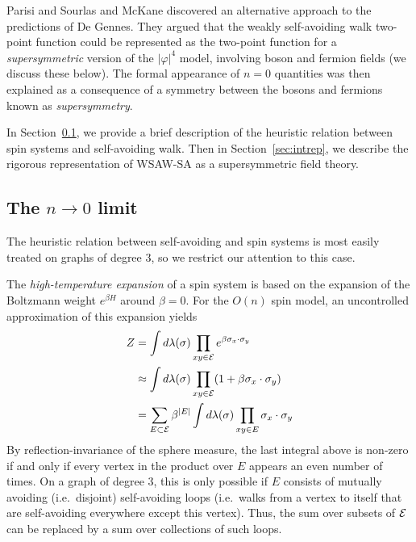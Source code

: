 Parisi and Sourlas \cite{PS80} and McKane \cite{McKa80} discovered
an alternative approach to the predictions of De Gennes. They argued that the weakly
self-avoiding walk two-point function could be represented as the two-point function
for a \emph{supersymmetric} version of the $|\varphi|^4$ model, involving boson and
fermion fields (we discuss these below). The formal appearance of $n = 0$ quantities
was then explained as a consequence of a symmetry between the bosons and fermions known
as \emph{supersymmetry}.

In Section~\ref{sec:ntozero}, we provide a brief description of the heuristic
relation between spin systems and self-avoiding walk. Then in Section~\ref{sec:intrep},
we describe the rigorous representation of WSAW-SA as a supersymmetric field
theory.


\subsection{The \texorpdfstring{$n\to0$}{n approaches 0} limit}
\label{sec:ntozero}

The heuristic relation between self-avoiding and spin systems is most easily treated
on graphs of degree $3$, so we restrict our attention to this case.

The \emph{high-temperature expansion} of a spin system is based on the expansion of the
Boltzmann weight $e^{\beta H}$ around $\beta = 0$.
For the $O(n)$ spin model, an uncontrolled approximation of this expansion yields
\begin{align}
Z 
	&=
\int d\lambda(\sigma) \prod_{xy\in\mathcal{E}} e^{\beta \sigma_x \cdot \sigma_y} \nonumber \\
	&\approx
\int d\lambda(\sigma) \prod_{xy\in\mathcal{E}} (1 + \beta \sigma_x \cdot \sigma_y) \nonumber \\
	&=
\sum_{E \subset \mathcal{E}} \beta^{|E|} \int d\lambda(\sigma) \prod_{xy \in E} \sigma_x \cdot \sigma_y
\end{align}
By reflection-invariance of the sphere measure, the last integral above is non-zero
if and only if every vertex in the product over $E$ appears an even number of times.
On a graph of degree $3$, this is only possible if $E$ consists of mutually avoiding
(i.e.\ disjoint) self-avoiding
loops (i.e.\ walks from a vertex to itself that are self-avoiding everywhere except this
vertex). Thus, the sum over subsets of $\mathcal{E}$ can be replaced by a sum over collections of
such loops.

